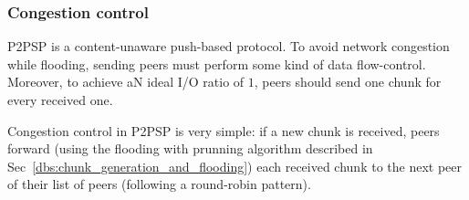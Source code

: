 \begin{comment}
For each ${\cal P}_k\in N({\cal P}_i)$, ${\cal P}_i$ checks if a chunk
has been received from ${\cal P}_k$. If ${\cal P}_i$ detects that
${\cal P}_k$ has not sent a chunk to it during $L$ consecutive rounds,
performs $N({\cal P}_i) = N({\cal P}_i)\setminus{\cal P}_k$, and stops
sending to ${\cal P}_k$ more chunks.
\end{comment}
\begin{comment}
computes a
``chunk-debt'', denoted by $d({\cal P}_k)$, that is incremented each
time a chunk is received from ${\cal P}_k$ and decremented each time a
chunk is sent to ${\cal P}_k$. If ${\cal P}_i$ verifies that $d({\cal
  P}_k)>D$ (the maximum debt), then ${\cal P}_i$ considers that ${\cal
  P}_k$ is unable to communicate with it, performs $N({\cal P}_i) =
N({\cal P}_i)\setminus{\cal P}_k$, and stops sending to ${\cal P}_k$
more chunks.
\end{comment}

\subsubsection{Congestion control}
\label{dbs:congestion_control}
P2PSP is a content-unaware push-based protocol. To avoid network
congestion while flooding, sending peers must perform some kind of
data flow-control. Moreover, to achieve aN ideal I/O ratio of $1$,
peers should send one chunk for every received one.

Congestion control in P2PSP is very simple: if a new chunk is
received, peers forward (using the flooding with prunning algorithm
described in Sec~\ref{dbs:chunk_generation_and_flooding}) each
received chunk to the next peer of their list of peers (following a
round-robin pattern).


